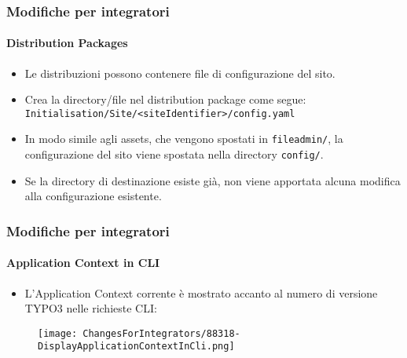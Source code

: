 
\begin{frame}[fragile]
	\frametitle{Modifiche per integratori}
	\framesubtitle{Distribution Packages}

	\lstset{basicstyle=\tiny\ttfamily}

	\begin{itemize}
		\item Le distribuzioni possono contenere file di configurazione del sito.

		\item Crea la directory/file nel distribution package come segue:\newline
			\texttt{Initialisation/Site/<siteIdentifier>/config.yaml}

		\item In modo simile agli assets, che vengono spostati in \texttt{fileadmin/},\newline
			la configurazione del sito viene spostata nella directory \texttt{config/}.

		\item Se la directory di destinazione esiste già, non viene apportata alcuna modifica alla configurazione esistente.
	\end{itemize}

\end{frame}


\begin{frame}[fragile]
	\frametitle{Modifiche per integratori}
	\framesubtitle{Application Context in CLI}

	\begin{itemize}
		\item L'Application Context corrente è mostrato accanto al numero di versione
			TYPO3 nelle richieste CLI:
	\end{itemize}

	\begin{figure}
		\texttt{[image: ChangesForIntegrators/88318-DisplayApplicationContextInCli.png]}
	\end{figure}

\end{frame}

